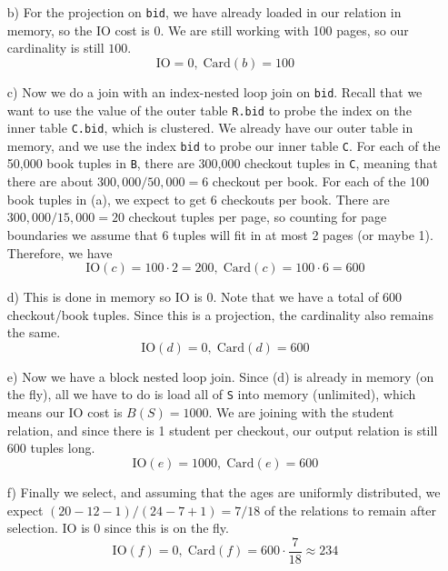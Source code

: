 \begin{example}
\begin{enumerate}
      \item[b)] For the projection on \texttt{bid}, we have already loaded in our relation in memory, so the IO cost is $0$. We are still working with 100 pages, so our cardinality is still $100$. 
        \begin{equation}
          \mathrm{IO} = 0, \; \mathrm{Card}(b) = 100 
        \end{equation} 

      \item[c)] Now we do a join with an index-nested loop join on \texttt{bid}. Recall that we want to use the value of the outer table \texttt{R.bid} to probe the index on the inner table \texttt{C.bid}, which is clustered. We already have our outer table in memory, and we use the index \texttt{bid} to probe our inner table \texttt{C}. For each of the 50,000 book tuples in \texttt{B}, there are 300,000 checkout tuples in \texttt{C}, meaning that there are about $300,000/50,000 = 6$ checkout per book. For each of the 100 book tuples in (a), we expect to get 6 checkouts per book. There are $300,000 / 15,000 = 20$ checkout tuples per page, so counting for page boundaries we assume that 6 tuples will fit in at most 2 pages (or maybe 1). Therefore, we have 
        \begin{equation}
          \mathrm{IO}(c) = 100 \cdot 2 = 200, \; \mathrm{Card}(c) = 100 \cdot 6 = 600
        \end{equation}

      \item[d)] This is done in memory so IO is $0$. Note that we have a total of 600 checkout/book tuples. Since this is a projection, the cardinality also remains the same. 
        \begin{equation}
          \mathrm{IO}(d) = 0, \; \mathrm{Card}(d) = 600 
        \end{equation}

      \item[e)] Now we have a block nested loop join. Since (d) is already in memory (on the fly), all we have to do is load all of \texttt{S} into memory (unlimited), which means our IO cost is $B(S) = 1000$. We are joining with the student relation, and since there is 1 student per checkout, our output relation is still 600 tuples long. 
        \begin{equation}
          \mathrm{IO}(e) = 1000, \; \mathrm{Card}(e) = 600
        \end{equation}

      \item[f)] Finally we select, and assuming that the ages are uniformly distributed, we expect $(20 - 12 - 1)/ (24 - 7 + 1) = 7/18$ of the relations to remain after selection. IO is $0$ since this is on the fly. 
        \begin{equation}
          \mathrm{IO}(f) = 0, \; \mathrm{Card}(f) = 600 \cdot \frac{7}{18} \approx 234
        \end{equation}


\end{enumerate}
\end{example}
